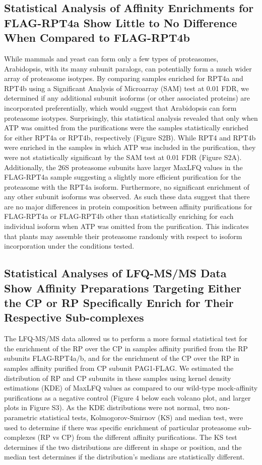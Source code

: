 \subsection{Statistical Analysis of Affinity Enrichments for FLAG-RPT4a Show Little to No Difference When Compared to FLAG-RPT4b}
	While mammals and yeast can form only a few types of proteasomes, Arabidopsis, with its many subunit paralogs, can potentially form a much wider array of proteasome isotypes. By comparing samples enriched for RPT4a and RPT4b using a Significant Analysis of Microarray (SAM) test at 0.01 FDR, we determined if any additional subunit isoforms (or other associated proteins) are incorporated preferentially, which would suggest that Arabidopsis can form proteasome isotypes. Surprisingly, this statistical analysis revealed that only when ATP was omitted from the purifications were the samples statistically enriched for either RPT4a or RPT4b, respectively (Figure S2B). While RPT4 and RPT4b were enriched in the samples in which ATP was included in the purification, they were not statistically significant by the SAM test at 0.01 FDR (Figure S2A). Additionally, the 26S proteasome subunits have larger MaxLFQ values in the FLAG-RPT4a sample suggesting a slightly more efficient purification for the proteasome with the RPT4a isoform. Furthermore, no significant enrichment of any other subunit isoforms was observed. As such these data suggest that there are no major differences in protein composition between affinity purifications for FLAG-RPT4a or FLAG-RPT4b other than statistically enriching for each individual isoform when ATP was omitted from the purification. This indicates that plants may assemble their proteasome randomly with respect to isoform incorporation under the conditions tested. 

\subsection{Statistical Analyses of LFQ-MS/MS Data Show Affinity Preparations Targeting Either the CP or RP Specifically Enrich for Their Respective Sub-complexes}
	The LFQ-MS/MS data allowed us to perform a more formal statistical test for the enrichment of the RP over the CP in samples affinity purified from the RP subunits FLAG-RPT4a/b, and for the enrichment of the CP over the RP in samples affinity purified from CP subunit PAG1-FLAG. We estimated the distribution of RP and CP subunits in these samples using kernel density estimations (KDE) of MaxLFQ values as compared to our wild-type mock-affinity purifications as a negative control (Figure 4 below each volcano plot, and larger plots in Figure S3).  As the KDE distributions were not normal, two non-parametric statistical tests, Kolmogorov-Smirnov (KS) and median test, were used to determine if there was specific enrichment of particular proteasome sub-complexes (RP vs CP) from the different affinity purifications. The KS test determines if the two distributions are different in shape or position, and the median test determines if the distribution’s medians are statistically different.


